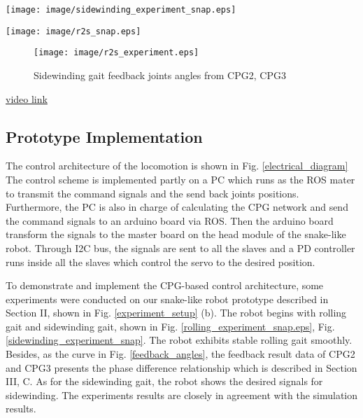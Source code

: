 \documentclass[letterpaper, 10 pt, conference]{ieeeconf}
\begin{document}
\begin{figure*}[th]
\centering
\texttt{[image: image/sidewinding\_experiment\_snap.eps]}
\caption{Snapshots of the robot rolling, the CPG parameters: amplitude $\pm30^{\circ}$, frequency $3Hz$, phase difference $pi/2$. See also the link below.}
\label{sidewinding_experiment_snap}
\end{figure*}

\begin{figure*}[th]
\centering
\texttt{[image: image/r2s\_snap.eps]}
\caption{Snapshots of the robot rolling, the CPG parameters: amplitude $\pm30^{\circ}$, frequency $3Hz$, phase difference $pi/2$. See also the link below.}
\label{r2s_snap}
\end{figure*}

\begin{figure}[thpb]
\centering
    \texttt{[image: image/r2s\_experiment.eps]}
    \caption{Sidewinding gait feedback joints angles from CPG2, CPG3}
    \label{r2s_experiment}
\end{figure}

\href{https://www.youtube.com/channel/UCC-bpOlhM7zSwDCZjVuE2rQ/videos?view=0&shelf_id=0&sort=dd}{video link}

\subsection{Prototype Implementation}

The control architecture of the locomotion is shown in Fig. \ref{electrical_diagram} The control scheme is implemented partly on a PC which runs as the ROS mater to transmit the command signals and the send back joints positions. Furthermore, the PC is also in charge of calculating the CPG network and send the command signals to an arduino board via ROS. Then the arduino board transform the signals to the master board on the head module of the snake-like robot. Through I2C bus, the signals are sent to all the slaves and a PD controller runs inside all the slaves which control the servo to the desired position.

To demonstrate and implement the CPG-based control architecture, some experiments were conducted on our snake-like robot prototype described in Section II, shown in Fig. \ref{experiment_setup} (b). The robot begins with rolling gait and sidewinding gait, shown in Fig. \ref{rolling_experiment_snap.eps}, Fig. \ref{sidewinding_experiment_snap}. The robot exhibits stable rolling gait smoothly. Besides, as the curve in Fig. \ref{feedback_angles}, the feedback result data of CPG2 and CPG3 presents the phase difference relationship which is described in Section III, C.
As for the sidewinding gait, the robot shows the desired signals for sidewinding. The experiments results are closely in agreement with the simulation results.
\end{document}
